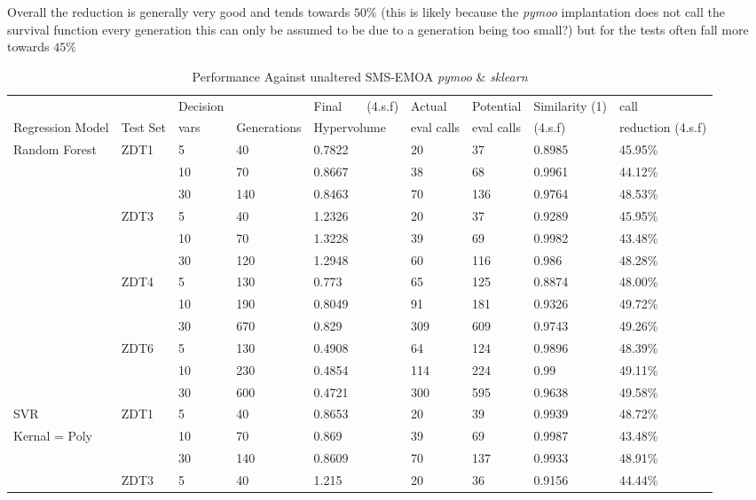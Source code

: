 \documentclass[sigconf,review,nonacm]{acmart}
\begin{document}
\noindent Overall the reduction is generally very good and tends towards $50\%$ (this is likely because the \textit{pymoo} implantation does not call the survival function every generation this can only be assumed to be due to a generation being too small?) but for the tests often fall more towards $45\%$


 

\centering

\begin{table}[b] 
\caption{Performance Against unaltered SMS-EMOA \textit{pymoo} \& \textit{sklearn}}
\begin{tabular}{l|llllll|l|l}
\label{Table1}
 & & Decision & & Final\ \ \ \ (4.s.f) & Actual & Potential & Similarity (1) & call \\ 
Regression Model & Test Set & vars & Generations & Hypervolume  & eval calls & eval calls &  (4.s.f) & reduction (4.s.f) \\ \hline
Random Forest & ZDT1 & 5 & 40 & 0.7822 & 20 & 37 & 0.8985 & 45.95\% \\
 & & 10 & 70 & 0.8667 & 38 & 68 & 0.9961 & 44.12\% \\
 & & 30 & 140 & 0.8463 & 70 & 136 & 0.9764 & 48.53\% \\
 & ZDT3 & 5 & 40 & 1.2326 & 20 & 37 & 0.9289 & 45.95\% \\
 & & 10 & 70 & 1.3228 & 39 & 69 & 0.9982 & 43.48\% \\
 & & 30 & 120 & 1.2948 & 60 & 116 & 0.986 & 48.28\% \\
 & ZDT4 & 5 & 130 & 0.773 & 65 & 125 & 0.8874 & 48.00\% \\
 & & 10 & 190 & 0.8049 & 91 & 181 & 0.9326 & 49.72\% \\
 & & 30 & 670 & 0.829 & 309 & 609 & 0.9743 & 49.26\% \\
 & ZDT6 & 5 & 130 & 0.4908 & 64 & 124 & 0.9896 & 48.39\% \\
 & & 10 & 230 & 0.4854 & 114 & 224 & 0.99 & 49.11\% \\
 & & 30 & 600 & 0.4721 & 300 & 595 & 0.9638 & 49.58\% \\ \hline
SVR & ZDT1 & 5 & 40 & 0.8653 & 20 & 39 & 0.9939 & 48.72\% \\
Kernal = Poly & & 10 & 70 & 0.869 & 39 & 69 & 0.9987 & 43.48\% \\
 & & 30 & 140 & 0.8609 & 70 & 137 & 0.9933 & 48.91\% \\
 & ZDT3 & 5 & 40 & 1.215 & 20 & 36 & 0.9156 & 44.44\% \\

\end{tabular}
\end{table}
\end{document}
